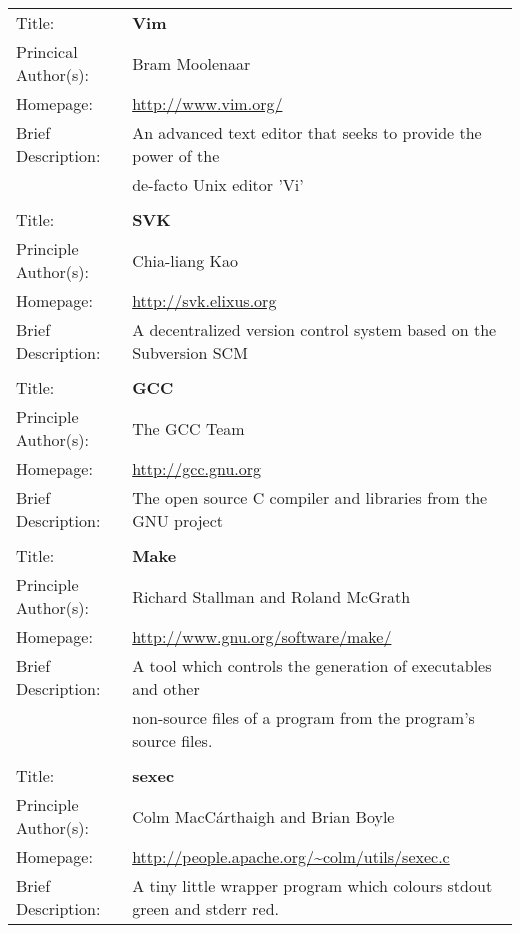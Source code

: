 
\begin{tabular}{ll}
Title: &	\textbf{Vim}	\\
Princical Author(s): &	Bram Moolenaar	\\
Homepage: &	\url{http://www.vim.org/}	\\	
Brief Description: 	&	An advanced text editor that seeks to provide the power of the \\ 
	&	de-facto Unix editor 'Vi'	\\
		&	\\
Title:	&	\textbf{SVK}	\\
Principle Author(s): &	Chia-liang Kao	\\
Homepage:	&	\url{http://svk.elixus.org}	\\
Brief Description:	&	A decentralized version control system based on the Subversion SCM \\
		&	\\
Title:	&	\textbf{GCC}	\\	
Principle Author(s): &	The GCC Team	\\
Homepage:	&	\url{http://gcc.gnu.org}	\\
Brief Description:	&	The open source C compiler and libraries from the GNU project \\
		&	\\
Title:	&	\textbf{Make}	\\
Principle Author(s): &	Richard Stallman and Roland McGrath	\\
Homepage:	&	\url{http://www.gnu.org/software/make/} \\
Brief Description:	&	A tool which controls the generation of executables and other \\
	&	non-source files of a program from the program's source files. \\
	&		\\
Title: 	&	\textbf{sexec}	\\
Principle Author(s): &	Colm MacC\'{a}rthaigh and Brian Boyle	\\
Homepage:	&	\url{http://people.apache.org/~colm/utils/sexec.c} \\
Brief Description:	&	A tiny little wrapper program which colours stdout green and stderr red.\\ 
\end{tabular}
